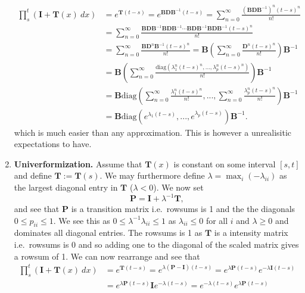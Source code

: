 \documentclass[a4paper,10pt,openany]{book}
\begin{document}
\begin{enumerate}
  \begin{align*}
    \prod_s^t(\mathbf I + \mathbf T(x)\ dx)&=e^{\mathbf{T}(t-s)}=e^{\mathbf{B}\mathbf{D}\mathbf{B}^{-1}(t-s)}=\sum_{n=0}^\infty \frac{\left(\mathbf{B}\mathbf{D}\mathbf{B}^{-1}\right)^n(t-s)^n}{n!}\\
    &=\sum_{n=0}^\infty \frac{\mathbf{B}\mathbf{D}\mathbf{B}^{-1}\mathbf{B}\mathbf{D}\mathbf{B}^{-1}\cdots \mathbf{B}\mathbf{D}\mathbf{B}^{-1}\mathbf{B}\mathbf{D}\mathbf{B}^{-1}(t-s)^n}{n!}\\
    &=\sum_{n=0}^\infty \frac{\mathbf{B}\mathbf{D}^n\mathbf{B}^{-1}(t-s)^n}{n!}=\mathbf{B}\left(\sum_{n=0}^\infty \frac{\mathbf{D}^n(t-s)^n}{n!}\right)\mathbf{B}^{-1}\\
    &=\mathbf{B}\left(\sum_{n=0}^\infty \frac{\text{diag}(\lambda_1^n(t-s)^n,...,\lambda_p^n(t-s)^n)}{n!}\right)\mathbf{B}^{-1}\\
    &=\mathbf{B}\text{diag}\left(\sum_{n=0}^\infty \frac{\lambda_1^n(t-s)^n}{n!},...,\sum_{n=0}^\infty \frac{\lambda_p^n(t-s)^n}{n!}\right)\mathbf{B}^{-1}\\
    &=\mathbf{B}\text{diag}\left(e^{\lambda_1(t-s)},...,e^{\lambda_p(t-s)}\right)\mathbf{B}^{-1}.
    \end{align*}
  which is much easier than any approximation. This is however a unrealisitic expectations to have.
\item
  \textbf{Univerformization.} Assume that \(\mathbf{T}(x)\) is constant on some interval \([s,t]\) and define \(\mathbf{T}:=\mathbf{T}(s)\). We may furthermore define \(\lambda= \max_{i}(-\lambda_{ii})\) as the largest diagonal entry in \(\mathbf T\) (\(\lambda <0\)). We now set
  \[
    \mathbf P = \mathbf I + \lambda^{-1}\mathbf T,
    \]
  and see that \(\mathbf P\) is a transition matrix i.e.~rowsums is 1 and the the diagonals \(0\le p_{ii}\le 1\). We see this as \(0\le \lambda^{-1}\lambda_{ii}\le1\) as \(\lambda_{ii}\le 0\) for all \(i\) and \(\lambda\ge 0\) and dominates all diagonal entries. The rowsums is 1 as \(\mathbf T\) is a intensity matrix i.e.~rowsums is 0 and so adding one to the diagonal of the scaled matrix gives a rowsum of 1. We can now rearrange and see that
  \begin{align*}
    \prod_s^t(\mathbf I + \mathbf T(x)\ dx)&=e^{\mathbf{T}(t-s)}=e^{\lambda (\mathbf P - \mathbf I)(t-s)}=e^{\lambda \mathbf P (t-s)}e^{-\lambda \mathbf I(t-s)}\\
    &=e^{\lambda \mathbf P (t-s)}\mathbf Ie^{-\lambda (t-s)}=e^{-\lambda (t-s)}e^{\lambda \mathbf P (t-s)}\\

\end{align*}
\end{enumerate}
\end{document}
